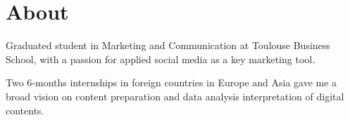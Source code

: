 \documentclass[]{cv}
\begin{document}


\footer{\today}





\section{About}

Graduated student in Marketing and Communication at Toulouse Business
School, with a passion for applied social media as a key marketing tool.

Two 6-months internships in foreign countries in Europe and Asia gave
me a broad vision on content preparation and data analysis
interpretation of digital contents.

\framebreak
\end{document}
